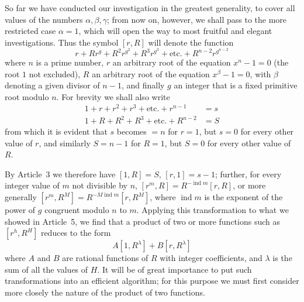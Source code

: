 So far we have conducted our investigation in the greatest generality, to cover all values of the numbers $\alpha,\beta,\gamma$; from now on, however, we shall pass to the more restricted case $\alpha=1$, which will open the way to most fruitful and elegant investigations. Thus the symbol $[r,R]$ will denote the function
\[
r+Rr^g+R^2r^{g^2}+R^3r^{g^3}+\text{etc.}+R^{n-2}r^{g^{n-2}}
\]
where $n$ is a prime number, $r$ an arbitrary root of the equation $x^n-1=0$ (the root $1$ not excluded), $R$ an arbitrary root of the equation $x^\beta-1=0$, with $\beta$ denoting a given divisor of $n-1$, and finally $g$ an integer that is a fixed primitive root modulo $n$. For brevity we shall also write
\[
\begin{aligned}
1+r+r^2+r^3+\text{etc.}+r^{n-1}&=s\\
1+R+R^2+R^3+\text{etc.}+R^{n-2}&=S
\end{aligned}
\]
from which it is evident that $s$ becomes $=n$ for $r=1$, but $s=0$ for every other value of $r$, and similarly $S=n-1$ for $R=1$, but $S=0$ for every other value of $R$.

By Article~3 we therefore have $[1,R]=S$, $[r,1]=s-1$; further, for every integer value of $m$ not divisible by $n$, $[r^m,R]=R^{-\operatorname{ind}m}[r,R]$, or more generally $[r^m,R^M]=R^{-M\operatorname{ind}m}[r,R^M]$, where $\operatorname{ind}m$ is the exponent of the power of $g$ congruent modulo $n$ to $m$. Applying this transformation to what we showed in Article~5, we find that a product of two or more functions such as $[r^h,R^H]$ reduces to the form
\[
A[1,R^\lambda]+B[r,R^\lambda]
\]
where $A$ and $B$ are rational functions of $R$ with integer coefficients, and $\lambda$ is the sum of all the values of $H$. It will be of great importance to put such transformations into an efficient algorithm; for this purpose we must first consider more closely the nature of the product of two functions.

